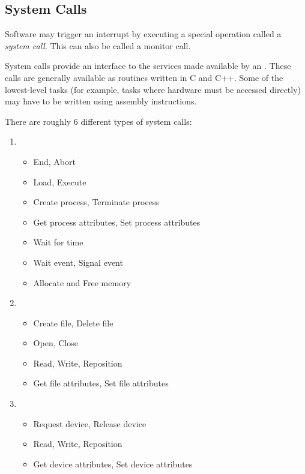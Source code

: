 \subsection{System Calls}\label{subsec:System_Calls}
\begin{definition}\label{def:System_Call}
  Software may trigger an interrupt by executing a special operation called a \emph{system call}.
  This can also be called a monitor call.

  System calls provide an interface to the services made available by an .
  These calls are generally available as routines written in C and C++.
  Some of the lowest-level tasks (for example, tasks where hardware must be accessed directly) may have to be written using assembly instructions.

  There are roughly 6 different types of system calls:
  \begin{enumerate}[noitemsep]
  \item {}
    \begin{itemize}[noitemsep]
    \item End, Abort
    \item Load, Execute
    \item Create process, Terminate process
    \item Get process attributes, Set process attributes
    \item Wait for time
    \item Wait event, Signal event
    \item Allocate and Free memory
    \end{itemize}
  \item {}
    \begin{itemize}[noitemsep]
    \item Create file, Delete file
    \item Open, Close
    \item Read, Write, Reposition
    \item Get file attributes, Set file attributes
    \end{itemize}
  \item {}
    \begin{itemize}[noitemsep]
    \item Request device, Release device
    \item Read, Write, Reposition
    \item Get device attributes, Set device attributes

\end{itemize}
\end{enumerate}
\end{definition}
